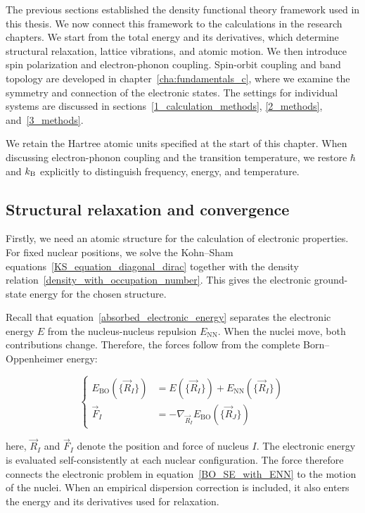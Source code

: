 The previous sections established the density functional theory framework used in this thesis.
We now connect this framework to the calculations in the research chapters.
We start from the total energy and its derivatives,
which determine structural relaxation, lattice vibrations, and atomic motion.
We then introduce spin polarization and electron-phonon coupling.
Spin-orbit coupling and band topology are developed in chapter~\ref{cha:fundamentals_c},
where we examine the symmetry and connection of the electronic states.
The settings for individual systems are discussed in sections~\ref{1_calculation_methods}, \ref{2_methods}, and~\ref{3_methods}.

We retain the Hartree atomic units specified at the start of this chapter.
When discussing electron-phonon coupling and the transition temperature,
we restore $\hbar$ and $k_\mathrm{B}$ explicitly to distinguish frequency, energy, and temperature.

\subsection{Structural relaxation and convergence}
\label{subsec:method_relaxation}

Firstly, we need an atomic structure for the calculation of electronic properties.
For fixed nuclear positions,
we solve the Kohn--Sham equations~\eqref{KS_equation_diagonal_dirac} together with the density relation~\eqref{density_with_occupation_number}.
This gives the electronic ground-state energy for the chosen structure.

Recall that equation~\eqref{absorbed_electronic_energy} separates the electronic energy $E$ from the nucleus-nucleus repulsion $E_\mathrm{NN}$.
When the nuclei move, both contributions change.
Therefore, the forces follow from the complete Born--Oppenheimer energy:

\begin{equation}
\left\{\begin{aligned}
    E_\mathrm{BO}(\{\vec{R}_I\})
    &= E(\{\vec{R}_I\})+E_\mathrm{NN}(\{\vec{R}_I\}) \\
    \vec{F}_I
    &= -\nabla_{\vec{R}_I}E_\mathrm{BO}(\{\vec{R}_J\})
\end{aligned}\right.
\label{BO_energy_and_force}
\end{equation}

here, $\vec{R}_I$ and $\vec{F}_I$ denote the position and force of nucleus $I$.
The electronic energy is evaluated self-consistently at each nuclear configuration.
The force therefore connects the electronic problem in equation~\eqref{BO_SE_with_ENN} to the motion of the nuclei.
When an empirical dispersion correction is included,
it also enters the energy and its derivatives used for relaxation.

